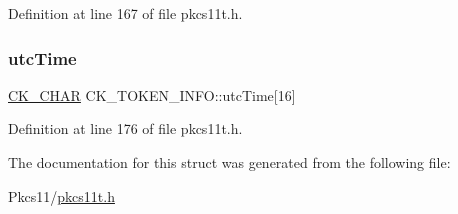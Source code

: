 Definition at line 167 of file pkcs11t.\+h.

\mbox{\label{struct_c_k___t_o_k_e_n___i_n_f_o_a381d3a6da89db61815436a01596cf618}} 
\subsubsection{\texorpdfstring{utc\+Time}{utcTime}}
{\footnotesize\ttfamily \hyperlink{pkcs11t_8h_a0ed4ef152a55e26f435b876927145580}{C\+K\+\_\+\+C\+H\+AR} C\+K\+\_\+\+T\+O\+K\+E\+N\+\_\+\+I\+N\+F\+O\+::utc\+Time\mbox{[}16\mbox{]}}



Definition at line 176 of file pkcs11t.\+h.



The documentation for this struct was generated from the following file\+:\begin{DoxyCompactItemize}
\item 
Pkcs11/\hyperlink{pkcs11t_8h}{pkcs11t.\+h}\end{DoxyCompactItemize}

